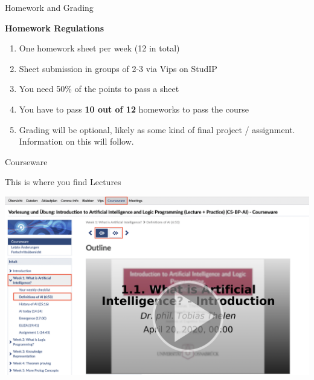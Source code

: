 \begin{frame}{Homework and Grading}

    \begin{alertblock}{\textbf{Homework Regulations}}
    \begin{enumerate}
        \item One homework sheet per week (12 in total)
        \item Sheet submission in groups of 2-3 via Vips on StudIP
        \item You need 50\% of the points to pass a sheet
        \item You have to pass \textbf{10 out of 12} homeworks to pass the course
        \item Grading will be optional, likely as some kind of final project / assignment. Information on this will follow.
    \end{enumerate}
    \end{alertblock}

\end{frame}

\begin{frame}{Courseware}

    This is where you find Lectures

    \vspace{1em}

    \includegraphics[width=\textwidth]{courseware.png}

\end{frame}



